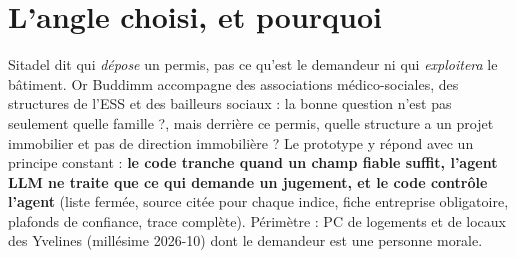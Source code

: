 \documentclass[10pt,a4paper]{article}
\begin{document}
\section{L'angle choisi, et pourquoi}
Sitadel dit qui \emph{dépose} un permis, pas ce qu'est le demandeur ni qui \emph{exploitera} le bâtiment. Or Buddimm accompagne
des associations médico-sociales, des structures de l'ESS et des bailleurs sociaux : la bonne question n'est pas seulement
\og quelle famille ?\fg{}, mais \og derrière ce permis, quelle structure a un projet immobilier et pas de direction immobilière ?\fg{}
Le prototype y répond avec un principe constant : \textbf{le code tranche quand un champ fiable suffit, l'agent LLM ne traite que
ce qui demande un jugement, et le code contrôle l'agent} (liste fermée, source citée pour chaque indice, fiche entreprise
obligatoire, plafonds de confiance, trace complète). Périmètre : PC de logements et de locaux des Yvelines (millésime 2026-10)
dont le demandeur est une personne morale.
\end{document}
